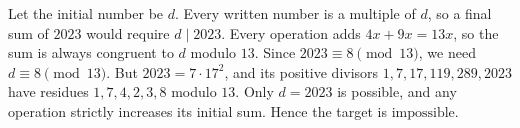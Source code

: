 Let the initial number be $d$. Every written number is a multiple of $d$, so a final sum of $2023$ would require $d\mid2023$. Every operation adds $4x+9x=13x$, so the sum is always congruent to $d$ modulo $13$. Since $2023\equiv8\pmod{13}$, we need $d\equiv8\pmod{13}$.
But $2023=7\cdot17^2$, and its positive divisors $1,7,17,119,289,2023$ have residues $1,7,4,2,3,8$ modulo $13$. Only $d=2023$ is possible, and any operation strictly increases its initial sum. Hence the target is $\boxed{\text{impossible}}$.
